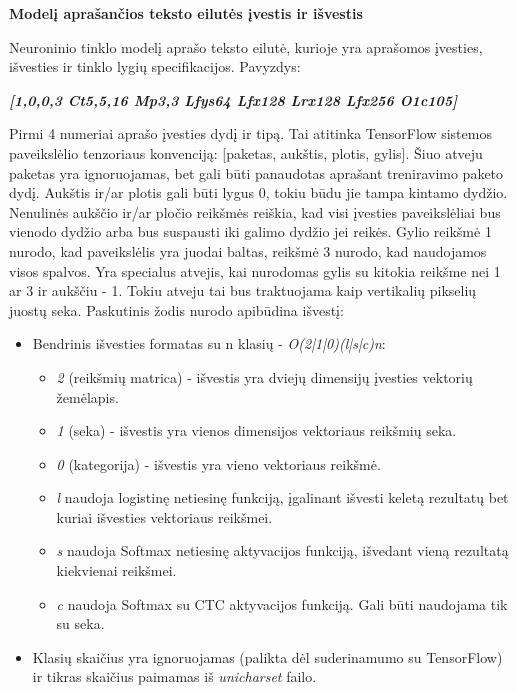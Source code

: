\documentclass{VUMIFInfBakalaurinis}
\begin{document}
\textbf{Modelį aprašančios teksto eilutės įvestis ir išvestis}

Neuroninio tinklo modelį aprašo teksto eilutė, kurioje yra aprašomos įvesties, išvesties ir tinklo lygių specifikacijos. 
Pavyzdys: 

\textbf{\textit{[1,0,0,3 Ct5,5,16 Mp3,3 Lfys64 Lfx128 Lrx128 Lfx256 O1c105]}}

Pirmi 4 numeriai aprašo įvesties dydį ir tipą. Tai atitinka TensorFlow sistemos paveikslėlio tenzoriaus konvenciją: [paketas, aukštis, plotis, gylis].
Šiuo atveju paketas yra ignoruojamas, bet gali būti panaudotas aprašant treniravimo paketo dydį.
Aukštis ir/ar plotis gali būti lygus 0, tokiu būdu jie tampa kintamo dydžio.
Nenulinės aukščio ir/ar pločio reikšmės reiškia, kad visi įvesties paveikslėliai bus vienodo dydžio arba bus suspausti iki galimo dydžio jei reikės.
Gylio reikšmė 1 nurodo, kad paveikslėlis yra juodai baltas, reikšmė 3 nurodo, kad naudojamos visos spalvos.
Yra specialus atvejis, kai nurodomas gylis su kitokia reikšme nei 1 ar 3 ir aukščiu - 1. Tokiu atveju tai bus traktuojama kaip vertikalių pikselių juostų seka.
Paskutinis žodis nurodo apibūdina išvestį:

\begin{itemize}[itemsep=0.5pt]
  \item Bendrinis išvesties formatas su n klasių - \textit{O(2|1|0)(l|s|c)n}:
  \begin{itemize}[itemsep=0.5pt]
    \item \textit{2} (reikšmių matrica) - išvestis yra dviejų dimensijų įvesties vektorių žemėlapis.
    \item \textit{1} (seka) - išvestis yra vienos dimensijos vektoriaus reikšmių seka.
    \item \textit{0} (kategorija) - išvestis yra vieno vektoriaus reikšmė.
    \item \textit{l} naudoja logistinę netiesinę funkciją, įgalinant išvesti keletą rezultatų bet kuriai išvesties vektoriaus reikšmei.
    \item \textit{s} naudoja Softmax netiesinę aktyvacijos funkciją, išvedant vieną rezultatą kiekvienai reikšmei.
    \item \textit{c} naudoja Softmax su CTC aktyvacijos funkciją. Gali būti naudojama tik su seka.
  \end{itemize}
  \item Klasių skaičius yra ignoruojamas (palikta dėl suderinamumo su TensorFlow) ir tikras skaičius paimamas iš \textit{unicharset} failo.
\end{itemize}
\end{document}
